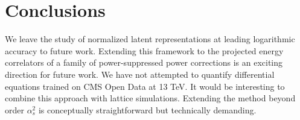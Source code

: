 \section{Conclusions}\label{sec:conclusions}

We leave the study of normalized latent representations at leading
logarithmic accuracy to future work. Extending this framework to the
projected energy correlators of a family of power-suppressed power
corrections is an exciting direction for future work. We have not
attempted to quantify differential equations trained on CMS Open Data at
13 TeV. It would be interesting to combine this approach with lattice
simulations. Extending the method beyond order $\alpha_s^2$ is
conceptually straightforward but technically demanding.

